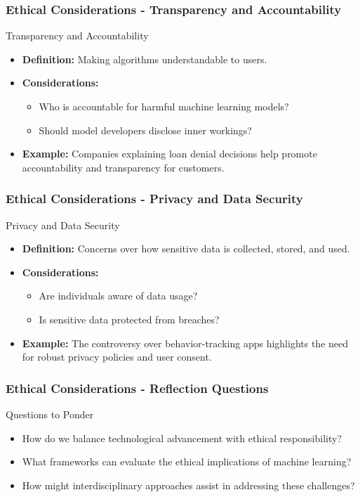 \documentclass[aspectratio=169]{beamer}
\begin{document}
\begin{frame}[fragile]
    \frametitle{Ethical Considerations - Transparency and Accountability}
    \begin{block}{Transparency and Accountability}
        \begin{itemize}
            \item \textbf{Definition:} Making algorithms understandable to users.
            \item \textbf{Considerations:}
            \begin{itemize}
                \item Who is accountable for harmful machine learning models?
                \item Should model developers disclose inner workings?
            \end{itemize}
            \item \textbf{Example:} Companies explaining loan denial decisions help promote accountability and transparency for customers.
        \end{itemize}
    \end{block}
\end{frame}

\begin{frame}[fragile]
    \frametitle{Ethical Considerations - Privacy and Data Security}
    \begin{block}{Privacy and Data Security}
        \begin{itemize}
            \item \textbf{Definition:} Concerns over how sensitive data is collected, stored, and used.
            \item \textbf{Considerations:}
            \begin{itemize}
                \item Are individuals aware of data usage?
                \item Is sensitive data protected from breaches?
            \end{itemize}
            \item \textbf{Example:} The controversy over behavior-tracking apps highlights the need for robust privacy policies and user consent.
        \end{itemize}
    \end{block}
\end{frame}

\begin{frame}[fragile]
    \frametitle{Ethical Considerations - Reflection Questions}
    \begin{block}{Questions to Ponder}
        \begin{itemize}
            \item How do we balance technological advancement with ethical responsibility?
            \item What frameworks can evaluate the ethical implications of machine learning?
            \item How might interdisciplinary approaches assist in addressing these challenges?
        \end{itemize}
    \end{block}
\end{frame}
\end{document}
